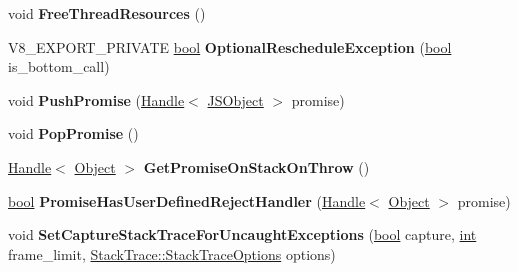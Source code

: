 \begin{DoxyCompactItemize}
\item 
\mbox{\label{classv8_1_1internal_1_1Isolate_a858345eefd66c1d3cc41334b6df8dae9}} 
void {\bfseries Free\+Thread\+Resources} ()
\item 
\mbox{\label{classv8_1_1internal_1_1Isolate_af1ebc122bf08aa361a5d73c0ea1b441d}} 
V8\+\_\+\+E\+X\+P\+O\+R\+T\+\_\+\+P\+R\+I\+V\+A\+TE \mbox{\hyperlink{classbool}{bool}} {\bfseries Optional\+Reschedule\+Exception} (\mbox{\hyperlink{classbool}{bool}} is\+\_\+bottom\+\_\+call)
\item 
\mbox{\label{classv8_1_1internal_1_1Isolate_ab84a7fc8e94d72635c289d539366f167}} 
void {\bfseries Push\+Promise} (\mbox{\hyperlink{classv8_1_1internal_1_1Handle}{Handle}}$<$ \mbox{\hyperlink{classv8_1_1internal_1_1JSObject}{J\+S\+Object}} $>$ promise)
\item 
\mbox{\label{classv8_1_1internal_1_1Isolate_a091efbd9fc9e16297eba62a6bb0ffb78}} 
void {\bfseries Pop\+Promise} ()
\item 
\mbox{\label{classv8_1_1internal_1_1Isolate_abe39e36b24243997a2de11120d916efc}} 
\mbox{\hyperlink{classv8_1_1internal_1_1Handle}{Handle}}$<$ \mbox{\hyperlink{classv8_1_1internal_1_1Object}{Object}} $>$ {\bfseries Get\+Promise\+On\+Stack\+On\+Throw} ()
\item 
\mbox{\label{classv8_1_1internal_1_1Isolate_a04edd2bfc7faafb6f40c6e471af52edf}} 
\mbox{\hyperlink{classbool}{bool}} {\bfseries Promise\+Has\+User\+Defined\+Reject\+Handler} (\mbox{\hyperlink{classv8_1_1internal_1_1Handle}{Handle}}$<$ \mbox{\hyperlink{classv8_1_1internal_1_1Object}{Object}} $>$ promise)
\item 
\mbox{\label{classv8_1_1internal_1_1Isolate_a78f604bee42e9628f7e2c0ff1e8601e8}} 
void {\bfseries Set\+Capture\+Stack\+Trace\+For\+Uncaught\+Exceptions} (\mbox{\hyperlink{classbool}{bool}} capture, \mbox{\hyperlink{classint}{int}} frame\+\_\+limit, \mbox{\hyperlink{classv8_1_1StackTrace_a9704e4a37949eb8eb8ccddbddf161492}{Stack\+Trace\+::\+Stack\+Trace\+Options}} options)
\item 

\end{DoxyCompactItemize}
